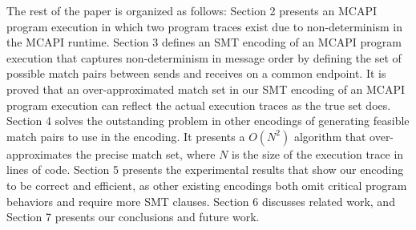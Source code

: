 The rest of the paper is organized as follows:
Section 2 presents an MCAPI program execution in which two program traces exist due to non-determinism in the MCAPI runtime. Section 3 defines an SMT encoding of an MCAPI program execution that captures non-determinism in message order by defining the set of possible match pairs between sends and receives on a common endpoint. It is proved that an over-approximated match set in our SMT encoding of an MCAPI program execution can reflect the actual execution traces as the true set does. Section 4 solves the outstanding problem in other encodings of generating feasible match pairs to use in the encoding. It presents a $O(N^2)$ algorithm that over-approximates the precise match set, where $N$ is the size of the execution trace in lines of code. Section 5 presents the experimental results that show our encoding to be correct and efficient, as other existing encodings both omit critical program behaviors and require more SMT clauses. Section 6 discusses related
work, and Section 7 presents our conclusions and future work.


